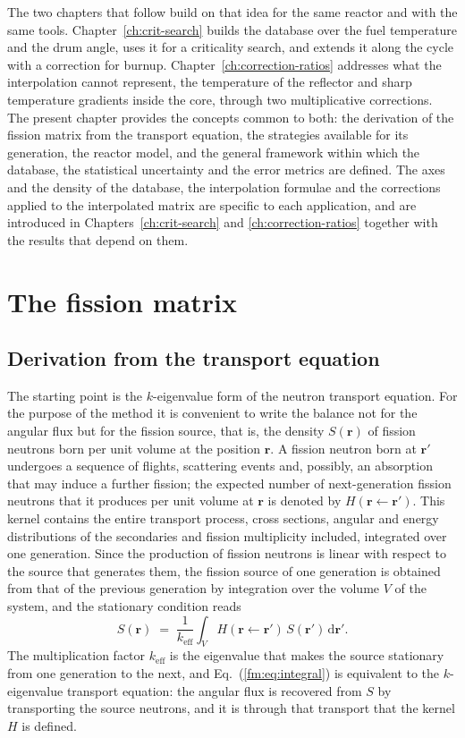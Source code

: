 The two chapters that follow build on that idea for the same reactor and with
the same tools. Chapter~\ref{ch:crit-search} builds the database over the fuel
temperature and the drum angle, uses it for a criticality search, and extends it
along the cycle with a correction for burnup. Chapter~\ref{ch:correction-ratios}
addresses what the interpolation cannot represent, the temperature of the
reflector and sharp temperature gradients inside the core, through two
multiplicative corrections. The present chapter provides the concepts common to both: the
derivation of the fission matrix from the transport equation, the strategies
available for its generation, the reactor model, and the general framework
within which the database, the statistical uncertainty and the error
metrics are defined. The axes and the density of the database, the
interpolation formulae and the corrections applied to the interpolated
matrix are specific to each application, and are introduced in
Chapters~\ref{ch:crit-search} and \ref{ch:correction-ratios} together with
the results that depend on them.

\section{The fission matrix}\label{fm:sec:definition}

\subsection{Derivation from the transport equation}

The starting point is the $k$-eigenvalue form of the neutron transport
equation. For the purpose of the method it is convenient to write the balance
not for the angular flux but for the fission source, that is, the density
$S(\mathbf r)$ of fission neutrons born per unit volume at the position
$\mathbf r$. A fission neutron born at $\mathbf r'$ undergoes a sequence of
flights, scattering events and, possibly, an absorption that may induce a further
fission; the expected number of next-generation fission neutrons that it
produces per unit volume at $\mathbf r$ is denoted by
$H(\mathbf r \leftarrow \mathbf r')$. This kernel contains the entire transport
process, cross sections, angular and energy distributions of the secondaries and
fission multiplicity included, integrated over one generation. Since the
production of fission neutrons is linear with respect to the source that generates them, the
fission source of one generation is obtained from that of the previous
generation by integration over the volume $V$ of the system, and the stationary
condition reads \cite{CarneyANE2014}
%
\begin{equation}
  S(\mathbf r) \;=\; \frac{1}{k_{\mathrm{eff}}}\int_{V}
  H(\mathbf r \leftarrow \mathbf r')\,S(\mathbf r')\,\mathrm d\mathbf r' .
  \label{fm:eq:integral}
\end{equation}
%
The multiplication factor $k_{\mathrm{eff}}$ is the eigenvalue that makes the
source stationary from one generation to the next, and
Eq.~(\ref{fm:eq:integral}) is equivalent to the $k$-eigenvalue transport
equation: the angular flux is recovered from $S$ by transporting the source
neutrons, and it is through that transport that the kernel $H$ is defined.

